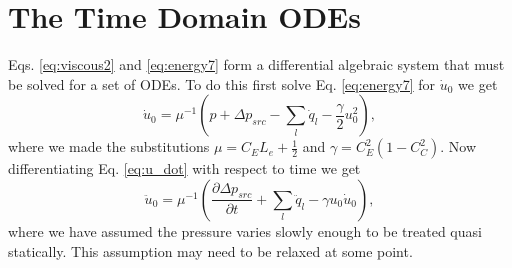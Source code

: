 \documentclass[superscriptaddress, onecolumn, prl]{revtex4}
\begin{document}
\section{The Time Domain ODEs}
Eqs. \ref{eq:viscous2} and \ref{eq:energy7} form a differential algebraic system that must be solved for a set of ODEs. To do this first solve Eq. \ref{eq:energy7} for $\dot{u}_0$ we get
\begin{equation}
\label{eq:u_dot}
\dot{u}_0 = \mu^{-1} \left(p + \Delta p_{src} - \sum_l{\dot{q}_l} -\frac{\gamma}{2} u_{0}^2  \right), 
\end{equation}
where we made the substitutions $\mu=C_E L_e + \frac{1}{2}$ and $\gamma = C_E^2 (1 - C_C^2)$. Now differentiating Eq. \ref{eq:u_dot} with respect to time we get 
\begin{equation}
\label{eq:u_ddot}
\ddot{u}_0 = \mu^{-1} \left(\frac{\partial \Delta p_{src}}{\partial t} + \sum_l{\ddot{q}_l} - \gamma u_{0} \dot{u}_0  \right),
\end{equation} 
where we have assumed the pressure varies slowly enough to be treated quasi statically. This assumption may need to be relaxed at some point.
\end{document}

